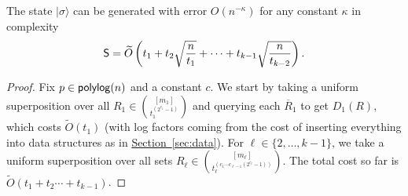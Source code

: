 \documentclass{article}
\renewcommand{\sec}[1]{\hyperref[sec:#1]{Section~\ref*{sec:#1}}}
\def\ket#1{{\lvert}#1\rangle}
\renewcommand{\>}{\rangle}
\newcommand{\<}{\langle}
\renewcommand{\(}{\left(}
\renewcommand{\)}{\right)}
\begin{document}
\begin{lemma}\label{lem:setupk}
	The state $\ket{\sigma}$ can be generated with error $O(n^{-\kappa})$ for any constant $\kappa$ in complexity
	\begin{equation*}
		{\sf S}=\widetilde{O}\left(t_1+t_2\sqrt{\frac{n}{t_1}} + \cdots + t_{k-1}\sqrt{\frac{n}{t_{k-2}}}\right).
	\end{equation*}
\end{lemma}
\begin{proof}
Fix $p\in {\sf polylog}(n)$ and a constant $c$.
	We start by taking a uniform superposition over all $R_1\in \binom{[m_1]}{t_1^{(2^{c_{1}}-1)}}$ and querying each $\overline{R}_1$ to get $D_1(R)$, which costs $\widetilde{O}(t_1)$ (with log factors coming from the cost of inserting everything into data structures as in \sec{data}). For $\ell\in\{2,\dots,k-1\}$, we take a uniform superposition over all sets $R_{\ell} \in \binom{[m_{\ell}]}{t_{\ell}^{(c_1\cdots c_{\ell-1}(2^{c_{\ell}}-1))}}$. The total cost so far is $\widetilde{O}(t_1+t_2 \cdots + t_{k-1})$. 


\end{proof}
\end{document}
